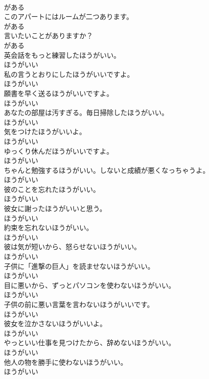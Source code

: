\documentclass[8pt]{extreport}
\begin{document}
\begin{CJK}{UTF8}{min}
\\	がある	
\\	このアパートにはルームが二つあります。	
\\	がある	
\\	言いたいことがありますか？	
\\	がある	
\\	英会話をもっと練習したほうがいい。	
\\	ほうがいい	
\\	私の言うとおりにしたほうがいいですよ。	
\\	ほうがいい	
\\	願書を早く送るほうがいいですよ。	
\\	ほうがいい	
\\	あなたの部屋は汚すぎる。毎日掃除したほうがいい。	
\\	ほうがいい	
\\	気をつけたほうがいいよ。	
\\	ほうがいい	
\\	ゆっくり休んだほうがいいですよ。	
\\	ほうがいい	
\\	ちゃんと勉強するほうがいい。しないと成績が悪くなっちゃうよ。	
\\	ほうがいい	
\\	彼のことを忘れたほうがいい。	
\\	ほうがいい	
\\	彼女に謝ったほうがいいと思う。	
\\	ほうがいい	
\\	約束を忘れないほうがいい。	
\\	ほうがいい	
\\	彼は気が短いから、怒らせないほうがいい。	
\\	ほうがいい	
\\	子供に「進撃の巨人」を読ませないほうがいい。	
\\	ほうがいい	
\\	目に悪いから、ずっとパソコンを使わないほうがいい。	
\\	ほうがいい	
\\	子供の前に悪い言葉を言わないほうがいいです。	
\\	ほうがいい	
\\	彼女を泣かさないほうがいいよ。	
\\	ほうがいい	
\\	やっといい仕事を見つけたから、辞めないほうがいい。	
\\	ほうがいい	
\\	他人の物を勝手に使わないほうがいい。	
\\	ほうがいい	

\end{CJK}
\end{document}

